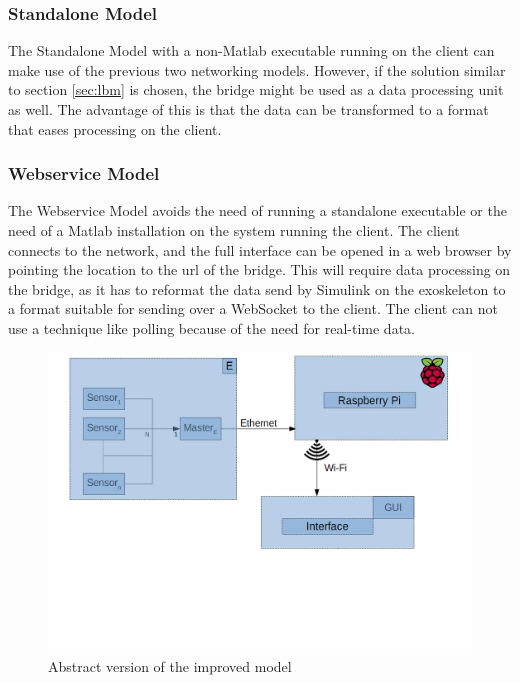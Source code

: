\subsubsection{Standalone Model}\label{sec:sm}
The Standalone Model with a non-Matlab executable running on the client can make use of the previous two networking models. However, if the solution similar to section \ref{sec:lbm} is chosen, the bridge might be used as a data processing unit as well. The advantage of this is that the data can be transformed to a format that eases processing on the client.

\subsubsection{Webservice Model}\label{sec:wm}
The Webservice Model avoids the need of running a standalone executable or the need of a Matlab installation on the system running the client. The client connects to the network, and the full interface can be opened in a web browser by pointing the location to the url of the bridge. This will require data processing on the bridge, as it has to reformat the data send by Simulink on the exoskeleton to a format suitable for sending over a WebSocket to the client. The client can not use a technique like polling because of the need for real-time data.

\begin{figure}[h]
	\centering
	\includegraphics[width=.75\textwidth]{ERBI-Model-RaspPie}
	\caption{Abstract version of the improved model} 
	\label{fig:improvedmodel}
\end{figure} 
